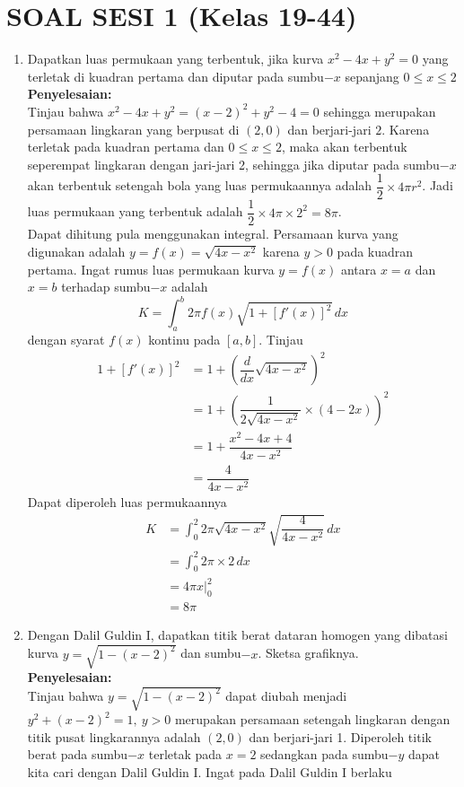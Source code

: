 \documentclass{article}
\begin{document}
\section*{SOAL SESI 1 (Kelas 19-44)}
\begin{enumerate}
	\item Dapatkan luas permukaan yang terbentuk, jika kurva $x^2-4x+y^2=0$ yang terletak di kuadran pertama dan diputar pada sumbu$-x$ sepanjang $0\leq x\leq 2$\\
	\textbf{Penyelesaian:}\\
	Tinjau bahwa $x^2-4x+y^2=(x-2)^2+y^2-4=0$ sehingga merupakan persamaan lingkaran yang berpusat di $(2,0)$ dan berjari-jari $2$. Karena terletak pada kuadran pertama dan $0\leq x\leq 2$, maka akan terbentuk seperempat lingkaran dengan jari-jari 2, sehingga jika diputar pada sumbu$-x$ akan terbentuk setengah bola yang luas permukaannya adalah $\dfrac{1}{2}\times 4\pi r^2$. Jadi luas permukaan yang terbentuk adalah $\dfrac{1}{2}\times 4\pi\times 2^2=8\pi$.\\
	Dapat dihitung pula menggunakan integral. Persamaan kurva yang digunakan adalah $y=f(x)=\sqrt{4x-x^2}$ karena $y>0$ pada kuadran pertama. Ingat rumus luas permukaan kurva $y=f(x)$ antara $x=a$ dan $x=b$ terhadap sumbu$-x$ adalah 
	$$ K=\int_a^b 2\pi f(x)\sqrt{1+[f'(x)]^2}\, dx $$
	dengan syarat $f(x)$ kontinu pada $[a,b]$. Tinjau 
	\begin{align*}
	1+[f'(x)]^2 &=1+\left(\dfrac{d}{dx}\sqrt{4x-x^2}\right)^2\\
	&= 1+\left(\dfrac{1}{2\sqrt{4x-x^2}}\times (4-2x)\right)^2\\
	&= 1+\dfrac{x^2-4x+4}{4x-x^2}\\
	&= \dfrac{4}{4x-x^2}
\end{align*}
	Dapat diperoleh luas permukaannya
	\begin{align*}
	K &= \int_0^2 2\pi \sqrt{4x-x^2}\sqrt{\dfrac{4}{4x-x^2}}\, dx\\
	&= \int_0^2 2\pi\times 2\, dx\\
	&= 4\pi x\big|^2_0\\
	&= 8\pi 
\end{align*}		 
	\item Dengan Dalil Guldin I, dapatkan titik berat dataran homogen yang dibatasi kurva $y=\sqrt{1-(x-2)^2}$ dan sumbu$-x$. Sketsa grafiknya.\\
	\textbf{Penyelesaian:}\\
	Tinjau bahwa $y=\sqrt{1-(x-2)^2}$ dapat diubah menjadi $y^2+(x-2)^2=1,~y>0$ merupakan persamaan setengah lingkaran dengan titik pusat lingkarannya adalah $(2,0)$ dan berjari-jari 1. Diperoleh titik berat pada sumbu$-x$ terletak pada $x=2$ sedangkan pada sumbu$-y$ dapat kita cari dengan Dalil Guldin I. Ingat pada Dalil Guldin I berlaku

\end{enumerate}
\end{document}
